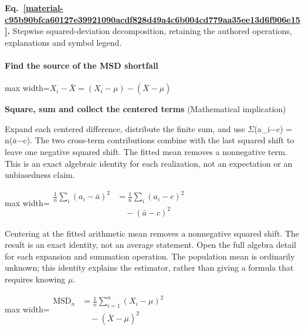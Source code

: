 \documentclass[11pt,a4paper]{article}
\begin{document}
\par\medskip
{}
\label{material-c95b90bfca60127e39921090acdf828d49a4c6b004cd779aa35ee13d6f906e15}
\noindent\textbf{Eq.~\ref*{material-c95b90bfca60127e39921090acdf828d49a4c6b004cd779aa35ee13d6f906e15}.} Stepwise squared-deviation decomposition, retaining the authored operations, explanations and symbol legend.\par\nopagebreak
\paragraph{Find the source of the MSD shortfall}
\begin{center}\begin{adjustbox}{max width=\linewidth}$\displaystyle X_i-\bar X=(X_i-\mu)-(\bar X-\mu)$\end{adjustbox}\end{center}
\noindent\textbf{Square, sum and collect the centered terms} (Mathematical implication)\par
Expand each centered difference, distribute the finite sum, and use \ensuremath{\Sigma}(a\_i\ensuremath{-}c) = n(\ensuremath{\bar{a}}\ensuremath{-}c). The two cross-term contributions combine with the last squared shift to leave one negative squared shift. The fitted mean removes a nonnegative term. This is an exact algebraic identity for each realization, not an expectation or an unbiasedness claim.
\begin{center}\begin{adjustbox}{max width=\linewidth}$\displaystyle \begin{aligned}\frac1n\sum_i(a_i-\bar a)^2&=\frac1n\sum_i(a_i-c)^2\\&\quad-(\bar a-c)^2\end{aligned}$\end{adjustbox}\end{center}

Centering at the fitted arithmetic mean removes a nonnegative squared shift. The result is an exact identity, not an average statement. Open the full algebra detail for each expansion and summation operation. The population mean is ordinarily unknown; this identity explains the estimator, rather than giving a formula that requires knowing \ensuremath{\mu}.
\begin{center}\begin{adjustbox}{max width=\linewidth}$\displaystyle \boxed{\begin{aligned}\mathrm{MSD}_n&=\frac1n\sum_{i=1}^n(X_i-\mu)^2\\&\quad-(\bar X-\mu)^2\end{aligned}}$\end{adjustbox}\end{center}
\end{document}
